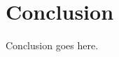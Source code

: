 \documentclass[10pt,twocolumn,letterpaper]{article}
\begin{document}
\section{Conclusion}

Conclusion goes here.

%
%
%
%
%
%
%
%
\end{document}
